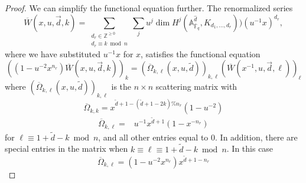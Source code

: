 \documentclass[11pt,letterpaper]{article}
\theoremstyle{definition}
\theoremstyle{remark}
\numberwithin{equation}{section}
\theoremstyle{dotless}
\renewcommand{\tilde}{\widetilde}
\begin{document}
\begin{proof}
We can simplify the functional equation further. The renormalized series
\[ \overline{W} (x,u, \vec{d},k) = \sum_{\substack{ d_r \in \mathbb Z^{\geq 0} \\ d_r \equiv k \bmod n }} \sum_j u^j \dim H^j( \mathbb A^{\hat{d} }_{\overline{\mathbb F}_q}, K_{d_1,\dots, d_r})) (u^{-1} x) ^{d_r}, \]
where we have substituted $u^{-1}x$ for $x$, satisfies the functional equation
\begin{equation} 
\left( \left(1-u^{-2} x^{n_r} \right)  \overline{W} (x,u ,  \vec{d}, k) \right)_k = \left( \overline{\Omega}_{k, \ell}(x, u, \tilde{d}) \right)_{k, \ell} \left( \overline{W}  \left(x^{-1} ,u,  \vec{d}, \ell\right) \right)_{\ell}
\end{equation}
where $\left( \overline{\Omega}_ {k, \ell}(x, u, \tilde{d}) \right)_{k, \ell}$ is the $n \times n$ scattering matrix with
\begin{equation*}
\overline{\Omega}_{k,k} =x^{ \tilde{d}+1 - (\tilde{d}+1-2k)\% n_r }  \left( 1-u^{-2} \right)
\end{equation*}
\begin{equation*}
\begin{split}
\overline{\Omega}_{k,\ell}=&u^{-1} x^{\tilde{d}+1}\left( 1-x^{-n_r }\right) \end{split}
\end{equation*}
for $\ell \equiv 1+\tilde{d} -k \bmod n$, and all other entries equal to $0$. In addition, there are special entries in the matrix when $k \equiv \ell \equiv 1+\tilde{d} -k \bmod n$. In this case 
\begin{equation*}
\overline{\Omega}_ {k,\ell}= \left(1-u^{-2} x^{n_r}\right)   x^{\tilde{d}+1-n_r} 
\end{equation*}




\end{proof}
\end{document}
